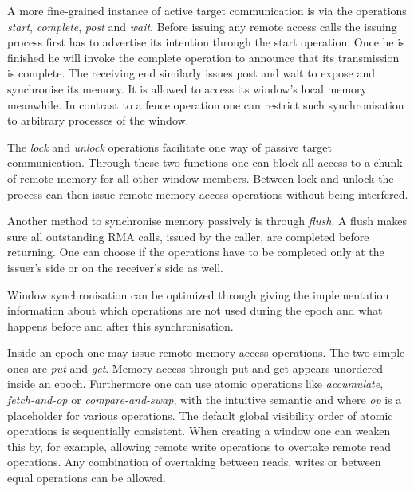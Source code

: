 \documentclass[a4paper, 10pt]{article}
\begin{document}
A more fine-grained instance of active target communication is via the operations \emph{start}, \emph{complete}, \emph{post} and \emph{wait}. Before issuing any remote access calls the issuing process first has to advertise its intention through the start operation. Once he is finished he will invoke the complete operation to announce that its transmission is complete. The receiving end similarly issues post and wait to expose and synchronise its memory. It is allowed to access its window's local memory meanwhile. In contrast to a fence operation one can restrict such synchronisation to arbitrary processes of the window.

The \emph{lock} and \emph{unlock} operations facilitate one way of passive target communication. Through these two functions one can block all access to a chunk of remote memory for all other window members. Between lock and unlock the process can then issue remote memory access operations without being interfered.

Another method to synchronise memory passively is through \emph{flush}. A flush makes sure all outstanding RMA calls, issued by the caller, are completed before returning. One can choose if the operations have to be completed only at the issuer's side or on the receiver's side as well.

Window synchronisation can be optimized through giving the implementation information about which operations are not used during the epoch and what happens before and after this synchronisation.

Inside an epoch one may issue remote memory access operations. The two simple ones are \emph{put} and \emph{get}. Memory access through put and get appears unordered inside an epoch.
Furthermore one can use atomic operations like \emph{accumulate}, \emph{fetch-and-op} or \emph{compare-and-swap}, with the intuitive semantic and where \emph{op} is a placeholder for various operations. The default global visibility order of atomic operations is sequentially consistent. When creating a window one can weaken this by, for example, allowing remote write operations to overtake remote read operations. Any combination of overtaking between reads, writes or between equal operations can be allowed.
\end{document}
